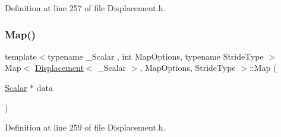 Definition at line 257 of file Displacement.\+h.

\hypertarget{class_map_3_01_displacement_3_01___scalar_01_4_00_01_map_options_00_01_stride_type_01_4_ad391569a149b8e0d7c276461901c9425}{}\label{class_map_3_01_displacement_3_01___scalar_01_4_00_01_map_options_00_01_stride_type_01_4_ad391569a149b8e0d7c276461901c9425} 
\subsubsection{\texorpdfstring{Map()}{Map()}\hspace{0.1cm}{\footnotesize\ttfamily [3/4]}}
{\footnotesize\ttfamily template$<$typename \+\_\+\+Scalar , int Map\+Options, typename Stride\+Type $>$ \\
Map$<$ \hyperlink{class_displacement}{Displacement}$<$ \+\_\+\+Scalar $>$, Map\+Options, Stride\+Type $>$\+::Map (\begin{DoxyParamCaption}\item[{\hyperlink{class_map_3_01_displacement_3_01___scalar_01_4_00_01_map_options_00_01_stride_type_01_4_a1558058db0e90cb7253d6b2dbf414099}{Scalar} $\ast$}]{data }\end{DoxyParamCaption})\hspace{0.3cm}{\ttfamily [inline]}}



Definition at line 259 of file Displacement.\+h.

\hypertarget{class_map_3_01_displacement_3_01___scalar_01_4_00_01_map_options_00_01_stride_type_01_4_aea0cddfda465eac57cb8914c2d462ad7}{}\label{class_map_3_01_displacement_3_01___scalar_01_4_00_01_map_options_00_01_stride_type_01_4_aea0cddfda465eac57cb8914c2d462ad7} 
